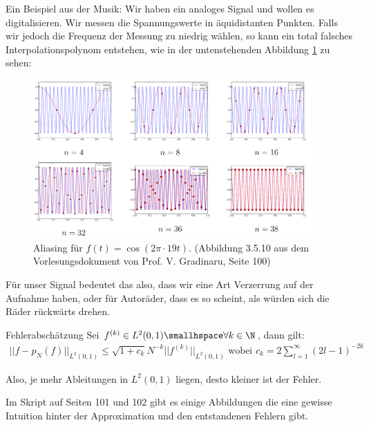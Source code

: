 \numberingOff
\inlineex Ein Beispiel aus der Musik: Wir haben ein analoges Signal und wollen es digitalisieren. 
Wir messen die Spannungswerte in äquidistanten Punkten. 
Falls wir jedoch die Frequenz der Messung zu niedrig wählen, so kann ein total falsches Interpolationspolynom entstehen,
wie in der untenstehenden Abbildung \ref{fig:aliasing} zu sehen:
\numberingOn
\begin{figure}[h!]
    \begin{center}
        \includegraphics[width=0.95\textwidth]{assets/01_interpolation/01_trigonometric/aliasing-in-music.png}
    \end{center}
    \caption{Aliasing für $f(t) = \cos(2\pi \cdot 19t)$. (Abbildung 3.5.10 aus dem Vorlesungsdokument von Prof. V. Gradinaru, Seite 100)}
    \label{fig:aliasing}
\end{figure}
Für unser Signal bedeutet das also, dass wir eine Art Verzerrung auf der Aufnahme haben, oder für Autoräder, dass es so scheint, als würden sich die Räder rückwärts drehen.

\begin{theorem}[]{Fehlerabschätzung}
    Sei $f^{(k)} \in L^2(0, 1) \smallhspace \forall k \in \N$, dann gilt:
    \rmvspace
    \begin{align*}
        ||f - p_N(f)||_{L^2(0, 1)} \leq \sqrt{1 + c_k} N^{-k} ||f^{(k)}||_{L^2(0, 1)} \text{ wobei } c_k = 2 \sum_{l = 1}^{\infty} (2l - 1)^{-2k}
    \end{align*}
\end{theorem}
Also, je mehr Ableitungen in $L^2(0, 1)$ liegen, desto kleiner ist der Fehler.


Im Skript auf Seiten 101 und 102 gibt es einige Abbildungen die eine gewisse Intuition hinter der Approximation und den entstandenen Fehlern gibt.

